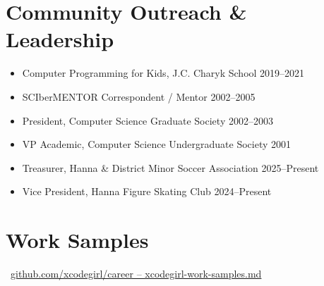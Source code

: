 \documentclass[11pt]{article}
\begin{document}
\section*{Community Outreach \& Leadership}
\begin{itemize}[nosep,leftmargin=*]
    \item Computer Programming for Kids, J.C. Charyk School \hfill 2019--2021
    \item SCIberMENTOR Correspondent / Mentor \hfill 2002--2005
    \item President, Computer Science Graduate Society \hfill 2002--2003
    \item VP Academic, Computer Science Undergraduate Society \hfill 2001
    \item Treasurer, Hanna \& District Minor Soccer Association \hfill 2025--Present
    \item Vice President, Hanna Figure Skating Club \hfill 2024--Present
\end{itemize}

\section*{Work Samples}
~\href{https://github.com/xcodegirl/career/blob/main/xcodegirl-work-samples.md}{github.com/xcodegirl/career -- xcodegirl-work-samples.md}
\end{document}
